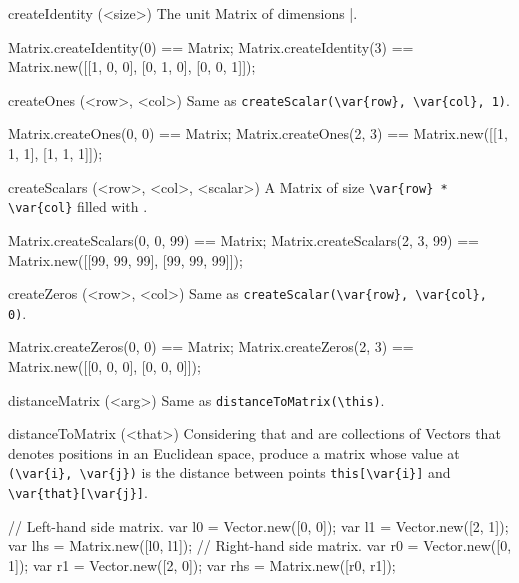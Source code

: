 \begin{urbiscriptapi}
\begin{urbiassert}
\end{urbiassert}

\item[createIdentity](<size>)%
  The unit Matrix of dimensions |.
\begin{urbiassert}
Matrix.createIdentity(0) == Matrix;
Matrix.createIdentity(3) == Matrix.new([[1, 0, 0], [0, 1, 0], [0, 0, 1]]);
\end{urbiassert}

\item[createOnes](<row>, <col>)%
  Same as \lstinline|createScalar(\var{row}, \var{col}, 1)|.
\begin{urbiassert}
Matrix.createOnes(0, 0) == Matrix;
Matrix.createOnes(2, 3) == Matrix.new([[1, 1, 1], [1, 1, 1]]);
\end{urbiassert}

\item[createScalars](<row>, <col>, <scalar>)%
  A Matrix of size \lstinline|\var{row} * \var{col}| filled with
  .
\begin{urbiassert}
Matrix.createScalars(0, 0, 99) == Matrix;
Matrix.createScalars(2, 3, 99) == Matrix.new([[99, 99, 99], [99, 99, 99]]);
\end{urbiassert}

\item[createZeros](<row>, <col>)%
  Same as \lstinline|createScalar(\var{row}, \var{col}, 0)|.
\begin{urbiassert}
Matrix.createZeros(0, 0) == Matrix;
Matrix.createZeros(2, 3) == Matrix.new([[0, 0, 0], [0, 0, 0]]);
\end{urbiassert}

\item[distanceMatrix](<arg>)%
  Same as \lstinline|distanceToMatrix(\this)|.
\begin{urbiassert}

\end{urbiassert}

\item[distanceToMatrix](<that>)%
  Considering that \this and \that are collections of Vectors that denotes
  positions in an Euclidean space, produce a matrix whose value at
  \lstinline|(\var{i}, \var{j})| is the distance between points
  \lstinline|this[\var{i}]| and \lstinline|\var{that}[\var{j}]|.
\begin{urbiassert}
// Left-hand side matrix.
var l0 = Vector.new([0, 0]);  var l1 = Vector.new([2, 1]);
var lhs = Matrix.new([l0, l1]);
// Right-hand side matrix.
var r0 = Vector.new([0, 1]);  var r1 = Vector.new([2, 0]);
var rhs = Matrix.new([r0, r1]);


\end{urbiassert}
\end{urbiscriptapi}
